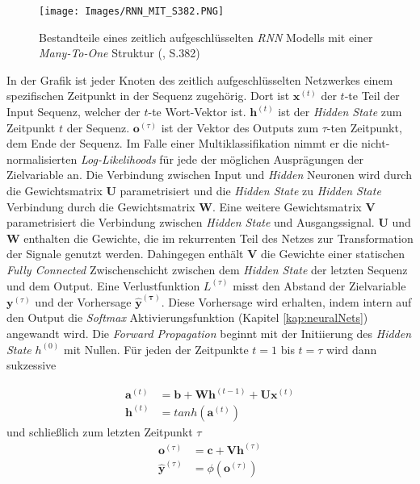 \documentclass[a4paper,11pt]{article}
\begin{document}
\begin{figure}[!ht]
\begin{center}
\texttt{[image: Images/RNN\_MIT\_S382.PNG]}
\caption{Bestandteile eines zeitlich aufgeschlüsselten \textit{RNN} Modells mit einer \textit{Many-To-One} Struktur (\cite{deepL}, S.382)}
\label{abb:RNNArch}
\end{center}
\end{figure}

In der Grafik ist jeder Knoten des zeitlich aufgeschlüsselten Netzwerkes einem spezifischen Zeitpunkt in der Sequenz zugehörig.
Dort ist $\bm{x}^{(t)}$ der $t$-te Teil der Input Sequenz, welcher der $t$-te Wort-Vektor ist. $\bm{h}^{(t)}$ ist der \textit{Hidden State} zum Zeitpunkt $t$ der Sequenz. $\bm{o}^{(\tau)}$ ist der Vektor des Outputs zum $\tau$-ten Zeitpunkt, dem Ende der Sequenz. Im Falle einer Multiklassifikation nimmt er die nicht-normalisierten \textit{Log-Likelihoods} für jede der möglichen Ausprägungen der Zielvariable an.
Die Verbindung zwischen Input und \textit{Hidden} Neuronen wird durch die Gewichtsmatrix $\bm{U}$ parametrisiert und die \textit{Hidden State} zu \textit{Hidden State} Verbindung durch die Gewichtsmatrix $\bm{W}$. Eine weitere Gewichtsmatrix $\bm{V}$ parametrisiert die Verbindung zwischen \textit{Hidden State} und Ausgangssignal. $\bm{U}$ und $\bm{W}$ enthalten die Gewichte, die im rekurrenten Teil des Netzes zur Transformation der Signale genutzt werden. Dahingegen enthält $\bm{V}$ die Gewichte einer statischen \textit{Fully Connected} Zwischenschicht zwischen dem \textit{Hidden State} der letzten Sequenz und dem Output.
Eine Verlustfunktion $L^{(\tau)}$ misst den Abstand der Zielvariable $\bm{y}^{(\tau)}$ und der Vorhersage $\bm{\hat{y}^{(\tau)}}$. Diese Vorhersage wird erhalten, indem intern auf den Output die \textit{Softmax} Aktivierungsfunktion (Kapitel \ref{kap:neuralNets}) angewandt wird. Die \textit{Forward Propagation} beginnt mit der Initiierung des \textit{Hidden State} $h^{(0)}$ mit Nullen. Für jeden der Zeitpunkte $t=1$ bis $t = \tau$ wird dann sukzessive 

\begin{align*}
    \bm{a}^{(t)} &= \bm{b} + \bm{W} \bm{h}^{(t-1)} + \bm{U}\bm{x}^{(t)} \\
    \bm{h}^{(t)} &= tanh(\bm{a}^{(t)}) 
\end{align*}
    und schließlich zum letzten Zeitpunkt $\tau$
\begin{align*}
    \bm{o}^{(\tau)} &= \bm{c} + \bm{V}\bm{h}^{(\tau)} \\
    \bm{\hat{y}}^{(\tau)} &= \phi(\bm{o}^{(\tau)})
\end{align*}
\end{document}
